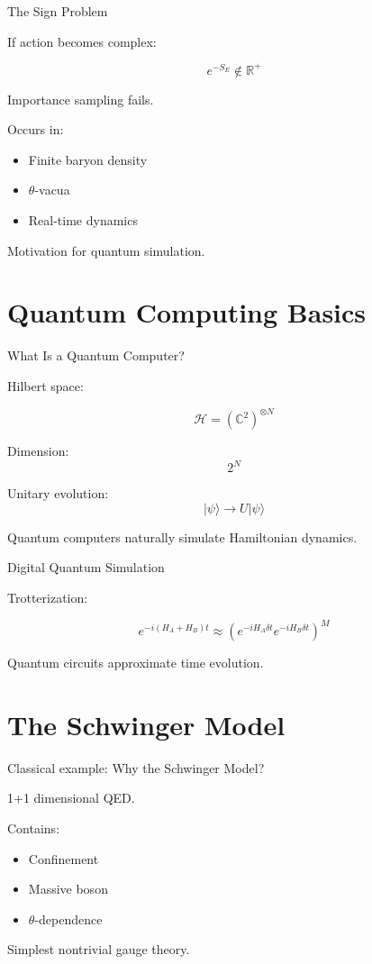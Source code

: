 \documentclass[11pt]{beamer}
\begin{document}
\begin{frame}{The Sign Problem}

If action becomes complex:

\[
e^{-S_E} \notin \mathbb{R}^+
\]

Importance sampling fails.

Occurs in:
\begin{itemize}
\item Finite baryon density
\item $\theta$-vacua
\item Real-time dynamics
\end{itemize}

Motivation for quantum simulation.
\end{frame}

\section{Quantum Computing Basics}

\begin{frame}{What Is a Quantum Computer?}

Hilbert space:

\[
\mathcal{H} = (\mathbb{C}^2)^{\otimes N}
\]

Dimension:
\[
2^N
\]

Unitary evolution:
\[
|\psi\rangle \rightarrow U |\psi\rangle
\]

Quantum computers naturally simulate Hamiltonian dynamics.
\end{frame}

\begin{frame}{Digital Quantum Simulation}

Trotterization:

\[
e^{-i(H_A + H_B)t}
\approx
\left(e^{-iH_A \delta t} e^{-iH_B \delta t}\right)^M
\]

Quantum circuits approximate time evolution.
\end{frame}

\section{The Schwinger Model}

\begin{frame}{Classical example: Why the Schwinger Model?}

1+1 dimensional QED.

Contains:
\begin{itemize}
\item Confinement
\item Massive boson
\item $\theta$-dependence
\end{itemize}

Simplest nontrivial gauge theory.
\end{frame}
\end{document}
